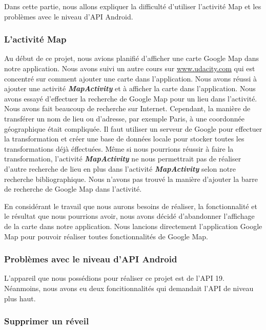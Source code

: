 \indent Dans cette partie, nous allons expliquer la difficulté d'utiliser l'activité Map et les problèmes avec le niveau d'API Android.

\subsubsection{L'activité Map}

\indent Au début de ce projet, nous avions planifié d'afficher une carte Google Map dans notre application. Nous avons suivi un autre cours sur \url{www.udacity.com} qui est concentré sur comment ajouter une carte dans l'application. Nous avons réussi à ajouter une activité \textbf{\emph{MapActivity}} et à afficher la carte dans l'application. Nous avons essayé d'effectuer la recherche de Google Map pour un lieu dans l'activité. Nous avons fait beaucoup de recherche sur Internet. Cependant, la manière de transférer un nom de lieu ou d'adresse, par exemple Paris, à une coordonnée géographique était compliquée. Il faut utiliser un serveur de Google pour effectuer la transformation et créer une base de données locale pour stocker toutes les transformations déjà éffectuées. Même si nous pourrions réussir à faire la transformation, l'activité \textbf{\emph{MapActivity}} ne nous permettrait pas de réaliser d'autre recherche de lieu en plus dans l'activité \textbf{\emph{MapActivity}} selon notre recherche bibliographique. Nous n'avons pas trouvé la manière d'ajouter la barre de recherche de Google Map dans l'activité.

\indent En considérant le travail que nous aurons besoins de réaliser, la fonctionnalité et le résultat que nous pourrions avoir, nous avons décidé d'abandonner l'affichage de la carte dans notre application. Nous lancions directement l'application Google Map pour pouvoir réaliser toutes fonctionnalités de Google Map.

\subsubsection{Problèmes avec le niveau d'API Android}

\indent L'appareil que nous possédions pour réaliser ce projet est de l'API 19. Néanmoins, nous avons eu deux foncitionnalités qui demandait l'API de niveau plus haut.

\subsubsection{Supprimer un réveil}

